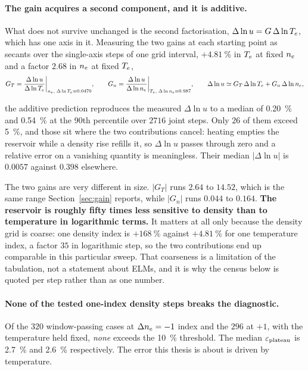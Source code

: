 \paragraph{The gain acquires a second component, and it is additive.} What does not
survive unchanged is the second factorisation, $\Delta\ln u = G\,\Delta\ln T_e$,
which has one axis in it. Measuring the two gains at each starting point as
secants over the single-axis steps of one grid interval, $+\SI{4.81}{\percent}$
in $T_e$ at fixed $n_e$ and a factor $2.68$ in $n_e$ at fixed $T_e$,
\begin{equation}
  G_T = \frac{\Delta\ln u}{\Delta\ln T_e}\bigg|_{n_e,\;\Delta\ln T_e = 0.0470},
  \qquad
  G_n = \frac{\Delta\ln u}{\Delta\ln n_e}\bigg|_{T_e,\;\Delta\ln n_e = 0.987},
  \qquad
  \Delta\ln u \simeq G_T\,\Delta\ln T_e + G_n\,\Delta\ln n_e ,
  \label{eq:gain_gradient}
\end{equation}

\noindent the additive prediction reproduces the measured $\Delta\ln u$ to a
median of \SI{0.20}{\percent} and \SI{0.54}{\percent} at the 90th percentile
over $2716$ joint steps. Only $26$ of them exceed \SI{5}{\percent}, and those
sit where the two contributions cancel: heating empties the reservoir while a
density rise refills it, so $\Delta\ln u$ passes through zero and a relative
error on a vanishing quantity is meaningless. Their median $|\Delta\ln u|$ is
$0.0057$ against $0.398$ elsewhere.

The two gains are very different in size. $|G_T|$ runs $2.64$ to $14.52$,
which is the same range Section~\ref{sec:gain} reports, while $|G_n|$ runs
$0.044$ to $0.164$. \textbf{The reservoir is roughly fifty times less sensitive
to density than to temperature in logarithmic terms.} It matters at all only
because the density grid is coarse: one density index is
$+\SI{168}{\percent}$ against $+\SI{4.81}{\percent}$ for one temperature index,
a factor $35$ in logarithmic step, so the two contributions end up comparable in
this particular sweep. That coarseness is a limitation of the tabulation, not a
statement about ELMs, and it is why the census below is quoted per step rather
than as one number.

\paragraph{None of the tested one-index density steps breaks the diagnostic.} Of the $320$
window-passing cases at $\Delta n_e = -1$ index and the $296$ at $+1$, with the
temperature held fixed, \emph{none} exceeds the \SI{10}{\percent} threshold. The
median $\varepsilon_{\mathrm{plateau}}$ is \SI{2.7}{\percent} and \SI{2.6}{\percent} respectively. The
error this thesis is about is driven by temperature.

